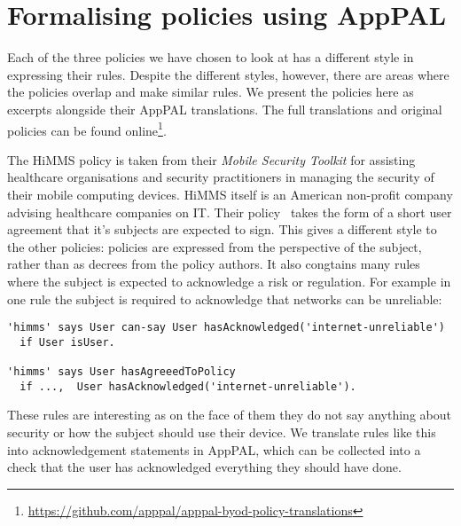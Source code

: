 \documentclass[a4paper]{article}
\begin{document}
\section{Formalising policies using AppPAL}
\label{sec:idea}

Each of the three policies we have chosen to look at has a different style in expressing their rules.
Despite the different styles, however, there are areas where the policies overlap and make similar rules.
We present the policies here as excerpts alongside their AppPAL translations.
The full translations and original policies can be found online\footnote{\url{https://github.com/apppal/apppal-byod-policy-translations}}.

The \ac{HiMMS} policy is taken from their \emph{Mobile Security Toolkit} for assisting healthcare organisations and security practitioners in managing the security of their mobile computing devices. 
\ac{HiMMS} itself is an American non-profit company advising healthcare companies on IT.
Their policy~\cite{healthcare_information_and_management_systems_society_mobile_2012} takes the form of a short user agreement that it's subjects are expected to sign.  
This gives a different style to the other policies: policies are expressed from the perspective of the subject, rather than as decrees from the policy authors.
It also congtains many rules where the subject is expected to acknowledge a risk or regulation.  
For example in one rule the subject is required to acknowledge that networks can be unreliable:
\begin{lstlisting}[title={\footnotesize\textbf{\ac{HiMMS}}:~\itshape 
I understand and accept that synchronisation relies on one or more cellular network providers and the Internet, and that both are subject to slowdowns and outages of extended duration that are beyond the control of IT.}]
'himms' says User can-say User hasAcknowledged('internet-unreliable')
  if User isUser.

'himms' says User hasAgreeedToPolicy
  if ...,  User hasAcknowledged('internet-unreliable').
\end{lstlisting}
These rules are interesting as on the face of them they do not say anything about security or how the subject should use their device.
We translate rules like this into acknowledgement statements in AppPAL, which can be collected into a check that the user has acknowledged everything they should have done.
\end{document}
